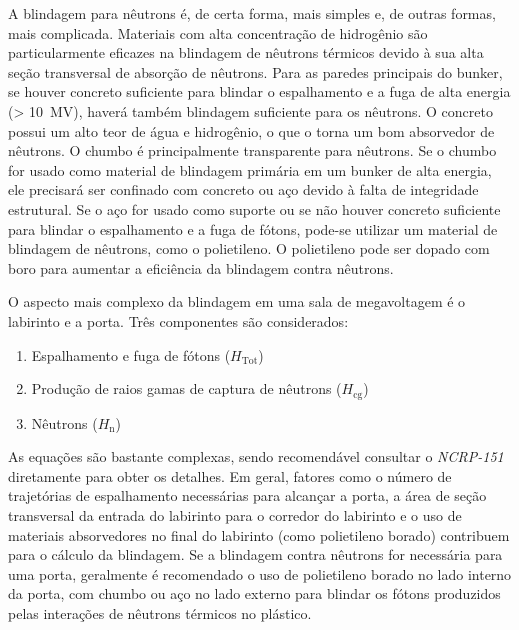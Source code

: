 \documentclass[11pt,a4paper]{article}
\begin{document}
	A blindagem para nêutrons é, de certa forma, mais simples e, de outras formas, mais complicada. Materiais com alta concentração de hidrogênio são particularmente eficazes na blindagem de nêutrons térmicos devido à sua alta seção transversal de absorção de nêutrons. Para as paredes principais do bunker, se houver concreto suficiente para blindar o espalhamento e a fuga de alta energia (> \SI{10}{\mega\volt}), haverá também blindagem suficiente para os nêutrons. O concreto possui um alto teor de água e hidrogênio, o que o torna um bom absorvedor de nêutrons. O chumbo é principalmente transparente para nêutrons. Se o chumbo for usado como material de blindagem primária em um bunker de alta energia, ele precisará ser confinado com concreto ou aço devido à falta de integridade estrutural. Se o aço for usado como suporte ou se não houver concreto suficiente para blindar o espalhamento e a fuga de fótons, pode-se utilizar um material de blindagem de nêutrons, como o polietileno. O polietileno pode ser dopado com boro para aumentar a eficiência da blindagem contra nêutrons.

	O aspecto mais complexo da blindagem em uma sala de megavoltagem é o labirinto e a porta. Três componentes são considerados:

		\begin{enumerate}
		\item Espalhamento e fuga de fótons ($H_{\text{Tot}}$)
		\item Produção de raios gamas de captura de nêutrons ($H_{\text{cg}}$)
		\item Nêutrons ($H_{\text{n}}$)
		\end{enumerate}

	As equações são bastante complexas, sendo recomendável consultar o \textit{NCRP-151} diretamente para obter os detalhes. Em geral, fatores como o número de trajetórias de espalhamento necessárias para alcançar a porta, a área de seção transversal da entrada do labirinto para o corredor do labirinto e o uso de materiais absorvedores no final do labirinto (como polietileno borado) contribuem para o cálculo da blindagem. Se a blindagem contra nêutrons for necessária para uma porta, geralmente é recomendado o uso de polietileno borado no lado interno da porta, com chumbo ou aço no lado externo para blindar os fótons produzidos pelas interações de nêutrons térmicos no plástico.
\end{document}
